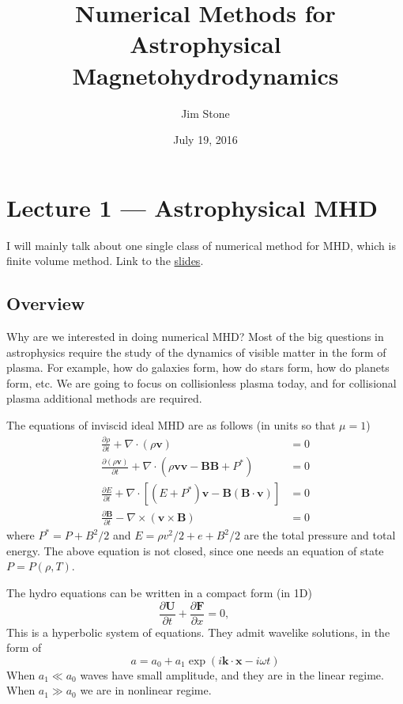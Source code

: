 \documentclass[letterpaper, 11pt]{article}
\numberwithin{equation}{section}
\numberwithin{figure}{section}
\begin{document}
\title{Numerical Methods for Astrophysical Magnetohydrodynamics}
\author{Jim Stone}
\date{July 19, 2016}

\maketitle

\section{Lecture 1 --- Astrophysical MHD}

I will mainly talk about one single class of numerical method for MHD, which is
finite volume method. Link to the \href{http://www.astro.princeton.edu/~jstone/downloads/papers/Lecture1.pdf}{slides}.

\subsection{Overview}

Why are we interested in doing numerical MHD? Most of the big questions in
astrophysics require the study of the dynamics of visible matter in the form of
plasma. For example, how do galaxies form, how do stars form, how do planets
form, etc. We are going to focus on collisionless plasma today, and for
collisional plasma additional methods are required.

The equations of inviscid ideal MHD are as follows (in units so that $\mu = 1$)
\begin{align}
  \frac{\partial\rho}{\partial t} + \nabla \cdot \left( \rho \mathbf{v} \right) &= 0 \\
  \frac{\partial(\rho \mathbf{v})}{\partial t} + \nabla \cdot \left( \rho \mathbf{v}\mathbf{v} - \mathbf{B}\mathbf{B} + P^{*} \right) &= 0 \\
  \frac{\partial E}{\partial t} + \nabla\cdot \left[ (E + P^{*})\mathbf{v} - \mathbf{B}\left( \mathbf{B}\cdot \mathbf{v} \right) \right] &= 0 \\
  \frac{\partial \mathbf{B}}{\partial t} - \nabla\times (\mathbf{v}\times \mathbf{B}) &= 0
\end{align}
where $P^{*} = P + B^2/2$ and $E = \rho v^2/2 + e + B^2/2$ are the total
pressure and total energy. The above equation is not closed, since one needs an
equation of state $P = P(\rho, T)$.

The hydro equations can be written in a compact form (in 1D)
\begin{equation}
  \label{eq:1}
  \frac{\partial \mathbf{U}}{\partial t} + \frac{\partial \mathbf{F}}{\partial x} = 0,\qquad 
\end{equation}
This is a hyperbolic system of equations. They admit wavelike solutions, in the
form of
\begin{equation}
  \label{eq:2}
  a = a_0 + a_1\exp(i\mathbf{k}\cdot \mathbf{x} - i\omega t)
\end{equation}
When $a_1\ll a_0$ waves have small amplitude, and they are in the linear regime.
When $a_1\gg a_0$ we are in nonlinear regime.
\end{document}
